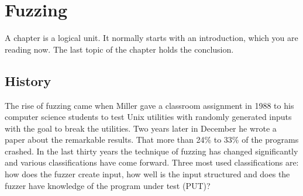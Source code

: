 \chapter{Fuzzing}
\label{cha:2:fuzzing}
A chapter is a logical unit. It normally starts with an introduction, which
you are reading now. The last topic of the chapter holds the conclusion.

%


\section{History} 
The rise of fuzzing came when Miller gave a classroom assignment\cite{21FuzzingAssignment} in 1988 to his computer science students to test Unix utilities with randomly generated inputs with the goal to break the utilities. Two years later in December he wrote a paper\cite{4originalFuzzingUnixUtils} about the remarkable results. That more than 24\% to 33\% of the programs crashed.
In the last thirty years the technique of fuzzing has changed significantly and various classifications have come forward\cite{12Fuzzingasurvey}\cite{13manes2019survey}. Three most used classifications are: 
how does the fuzzer create input, how well is the input structured and does the fuzzer have knowledge of the program under test (PUT)?



